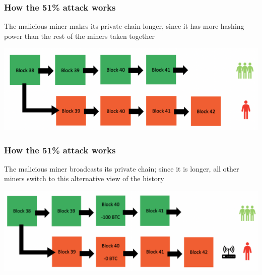 \documentclass[11pt]{beamer}  %
\begin{document}
\begin{frame}\frametitle{How the 51\% attack works}

  \begin{greenbox}{The malicious miner makes its private chain longer,
      since it has more hashing power than the rest of the miners taken together}
  \begin{center}
    \includegraphics[width=\textwidth,clip=false]{pictures/51attack_2.png}
  \end{center}
  \end{greenbox}

\end{frame}

\begin{frame}\frametitle{How the 51\% attack works}

  \begin{greenbox}{The malicious miner broadcasts its private chain; since it is longer,
      all other miners switch to this alternative view of the history}
  \begin{center}
    \includegraphics[width=\textwidth,clip=false]{pictures/51attack_3.png}
  \end{center}
  \end{greenbox}

\end{frame}
\end{document}
